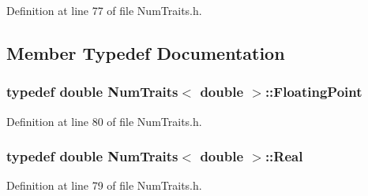 Definition at line 77 of file Num\-Traits.\-h.



\subsection{Member Typedef Documentation}
\hypertarget{struct_num_traits_3_01double_01_4_a349392f066b0eb4a34e471ed18663fb1}{
\subsubsection[{Floating\-Point}]{\setlength{\rightskip}{0pt plus 5cm}typedef {\bf double} {\bf Num\-Traits}$<$ {\bf double} $>$\-::{\bf Floating\-Point}}}\label{struct_num_traits_3_01double_01_4_a349392f066b0eb4a34e471ed18663fb1}


Definition at line 80 of file Num\-Traits.\-h.

\hypertarget{struct_num_traits_3_01double_01_4_a44b9c524e9e6083f8984bab806372e21}{
\subsubsection[{Real}]{\setlength{\rightskip}{0pt plus 5cm}typedef {\bf double} {\bf Num\-Traits}$<$ {\bf double} $>$\-::{\bf Real}}}\label{struct_num_traits_3_01double_01_4_a44b9c524e9e6083f8984bab806372e21}


Definition at line 79 of file Num\-Traits.\-h.



